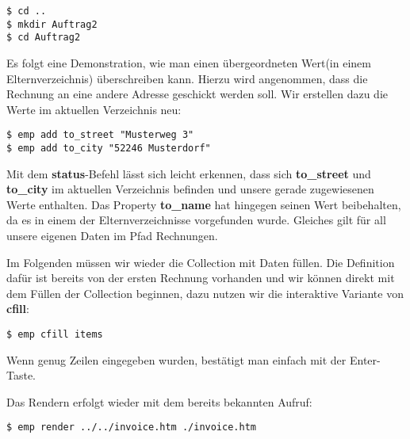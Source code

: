 \begin{lstlisting}[style=Bash]
$ cd ..
$ mkdir Auftrag2
$ cd Auftrag2
\end{lstlisting}

Es folgt eine Demonstration, wie man einen übergeordneten Wert(in einem Elternverzeichnis) überschreiben kann. Hierzu wird angenommen, dass die Rechnung an eine andere Adresse geschickt werden soll. Wir erstellen dazu die Werte im aktuellen Verzeichnis neu:

\begin{lstlisting}[style=Bash]
$ emp add to_street "Musterweg 3"
$ emp add to_city "52246 Musterdorf"
\end{lstlisting}

Mit dem \textbf{status}-Befehl lässt sich leicht erkennen, dass sich \textbf{to\_street} und \textbf{to\_city} im aktuellen Verzeichnis befinden und unsere gerade zugewiesenen Werte enthalten.
Das Property \textbf{to\_name} hat hingegen seinen Wert beibehalten, da es in einem der Elternverzeichnisse vorgefunden wurde. Gleiches gilt für all unsere eigenen Daten im Pfad Rechnungen.

Im Folgenden müssen wir wieder die Collection mit Daten füllen. Die Definition dafür ist bereits von der ersten Rechnung vorhanden und wir können direkt mit dem Füllen der Collection beginnen, dazu nutzen wir die interaktive Variante von \textbf{cfill}:
\begin{lstlisting}[style=Bash]
$ emp cfill items
\end{lstlisting}
Wenn genug Zeilen eingegeben wurden, bestätigt man einfach mit der Enter-Taste.

Das Rendern erfolgt wieder mit dem bereits bekannten Aufruf:
\begin{lstlisting}[style=Bash]
$ emp render ../../invoice.htm ./invoice.htm
\end{lstlisting}
